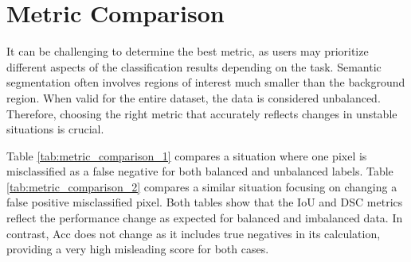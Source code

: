 \chapter{Metric Comparison}
\label{chap:metric_comparison}
It can be challenging to determine the best metric, as users may prioritize different aspects of the classification results depending on the task. Semantic segmentation often involves regions of interest much smaller than the background region. When valid for the entire dataset, the data is considered unbalanced. Therefore, choosing the right metric that accurately reflects changes in unstable situations is crucial.

Table \ref{tab:metric_comparison_1} compares a situation where one pixel is misclassified as a false negative for both balanced and unbalanced labels. Table \ref{tab:metric_comparison_2} compares a similar situation focusing on changing a false positive misclassified pixel. Both tables show that the \ac{IoU} and \ac{DSC} metrics reflect the performance change as expected for balanced and imbalanced data. In contrast, \ac{Acc} does not change as it includes true negatives in its calculation, providing a very high misleading score for both cases.


